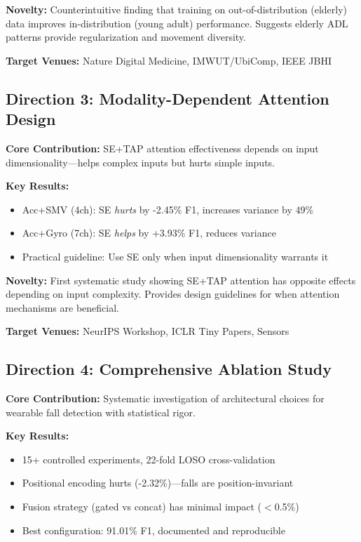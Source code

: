 \documentclass{article}
\begin{document}
\textbf{Novelty:} Counterintuitive finding that training on out-of-distribution (elderly) data improves in-distribution (young adult) performance. Suggests elderly ADL patterns provide regularization and movement diversity.

\textbf{Target Venues:} Nature Digital Medicine, IMWUT/UbiComp, IEEE JBHI

\subsection{Direction 3: Modality-Dependent Attention Design}

\textbf{Core Contribution:} SE+TAP attention effectiveness depends on input dimensionality---helps complex inputs but hurts simple inputs.

\textbf{Key Results:}
\begin{itemize}
    \item Acc+SMV (4ch): SE \textit{hurts} by -2.45\% F1, increases variance by 49\%
    \item Acc+Gyro (7ch): SE \textit{helps} by +3.93\% F1, reduces variance
    \item Practical guideline: Use SE only when input dimensionality warrants it
\end{itemize}

\textbf{Novelty:} First systematic study showing SE+TAP attention has opposite effects depending on input complexity. Provides design guidelines for when attention mechanisms are beneficial.

\textbf{Target Venues:} NeurIPS Workshop, ICLR Tiny Papers, Sensors

\subsection{Direction 4: Comprehensive Ablation Study}

\textbf{Core Contribution:} Systematic investigation of architectural choices for wearable fall detection with statistical rigor.

\textbf{Key Results:}
\begin{itemize}
    \item 15+ controlled experiments, 22-fold LOSO cross-validation
    \item Positional encoding hurts (-2.32\%)---falls are position-invariant
    \item Fusion strategy (gated vs concat) has minimal impact ($<$0.5\%)
    \item Best configuration: 91.01\% F1, documented and reproducible
\end{itemize}
\end{document}

